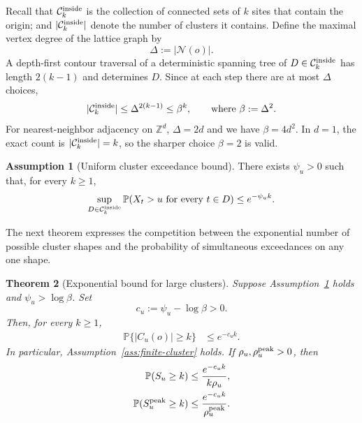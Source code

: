 \documentclass[aap,preprint]{imsart}
\theoremstyle{plain}
\newtheorem{theorem}{Theorem}[section]
\theoremstyle{definition}
\newtheorem{assumption}[theorem]{Assumption}
\def\P{{\mathbb P}}
\def\Z{{\mathbb Z}}
\begin{document}
Recall that $\mathcal C_k^{\rm inside}$ is the collection of connected
sets of $k$ sites that contain the origin; and $|\mathcal C_k^{\rm inside}|$ denote the number of clusters it contains. Define the maximal vertex degree of the lattice graph by
\[
\Delta:=|\mathcal N(o)|.
\]
A depth-first contour traversal of a deterministic spanning tree of
$D\in\mathcal C_k^{\rm inside}$ has length $2(k-1)$ and determines $D$.
Since at each step
there are at most $\Delta$ choices,
\begin{equation}\label{eq:ld-animal-count}
|\mathcal C_k^{\rm inside}|
\leq \Delta^{2(k-1)}\leq\beta^k,
\qquad \text{\rm where } \beta:=\Delta^2.
\end{equation}
For nearest-neighbor adjacency on $\Z^d$, $\Delta=2d$ and we have
$\beta=4d^2$.  In $d=1$, the exact count is
$|\mathcal C_k^{\rm inside}|=k$, so the sharper choice $\beta=2$ is valid.

\begin{assumption}[Uniform cluster exceedance bound]
	\label{ass:ld-connected-exceedance}
	There exists $\psi_u>0$ such that, for every $k\geq1$,
	\begin{equation}\label{eq:ld-joint-exceedance}
		\sup_{D\in\mathcal C_k^{\rm inside}}
		\P(X_t>u\text{ for every }t\in D)
		\leq e^{-\psi_u k}.
	\end{equation}
\end{assumption}


The next theorem expresses the competition between the exponential number
of possible cluster shapes and the probability of simultaneous exceedances
on any one shape.

\begin{theorem}[Exponential bound for large clusters]
	\label{thm:ld-general}
	Suppose Assumption~\ref{ass:ld-connected-exceedance} holds and
	$\psi_u>\log \beta$.  Set
	\begin{equation}\label{eq:ld-cu}
		c_u:=\psi_u-\log \beta>0.
	\end{equation}
	Then, for every $k\geq1$,
	\begin{align}
		\P\{|C_u(o)|\geq k\}
		&\leq e^{-c_u k}.
		\label{eq:ld-site-tail}
	\end{align}
	In particular, Assumption~\ref{ass:finite-cluster} holds.  If
	$\rho_u,\rho_u^{\rm peak}>0$, then
		\begin{align}
		\P(S_u\geq k)
		&\leq\frac{e^{-c_u k}}{k\rho_u},
		\label{eq:ld-exact-tail}\\
		\P(S_u^{\rm peak}\geq k)
		&\leq\frac{e^{-c_u k}}{\rho_u^{\rm peak}}.
		\label{eq:ld-peak-tail}
	\end{align}
\end{theorem}
\end{document}
